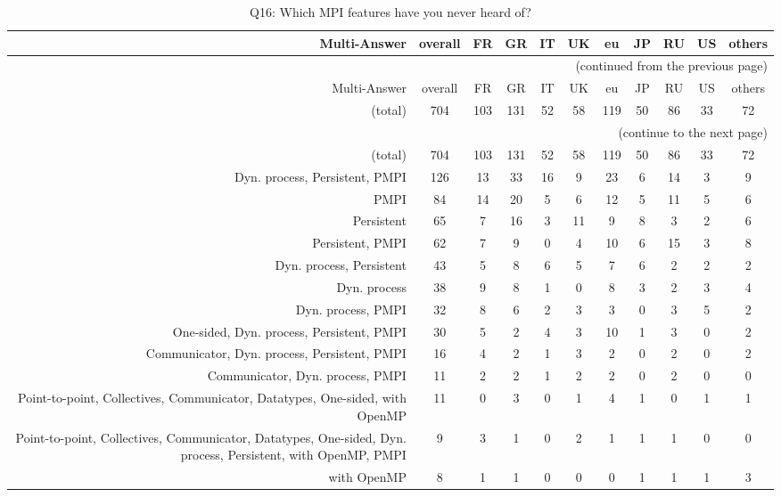 \clearpage%
{\footnotesize\begin{landscape}%
\begin{longtable}[htb]{r|c|c|c|c|c|c|c|c|c|c}%
\caption{Q16: Which MPI features have you never heard of?}%
\label{tab:Q16-mans} \\%
\hline%
Multi-Answer & overall & FR & GR & IT & UK & eu & JP & RU & US & others \\
 \hline%
\endfirsthead%
\multicolumn{11}{r}{(continued from the previous page)}\\%
\hline%
Multi-Answer & overall & FR & GR & IT & UK & eu & JP & RU & US & others \\
 \hline%
\endhead%
\hline%
(total) & 704 & 103 & 131 & 52 & 58 & 119 & 50 & 86 & 33 & 72 \\%
\hline%
\multicolumn{11}{r}{(continue to the next page)}\\%
\endfoot%
\hline%
(total) & 704 & 103 & 131 & 52 & 58 & 119 & 50 & 86 & 33 & 72 \\%
\hline%
\endlastfoot%
\hline%
{Dyn. process, Persistent, PMPI} & 126 & 13 & 33 & 16 & 9 & 23 & 6 & 14 & 3 & 9 \\%
{PMPI} & 84 & 14 & 20 & 5 & 6 & 12 & 5 & 11 & 5 & 6 \\%
{Persistent} & 65 & 7 & 16 & 3 & 11 & 9 & 8 & 3 & 2 & 6 \\%
{Persistent, PMPI} & 62 & 7 & 9 & 0 & 4 & 10 & 6 & 15 & 3 & 8 \\%
{Dyn. process, Persistent} & 43 & 5 & 8 & 6 & 5 & 7 & 6 & 2 & 2 & 2 \\%
{Dyn. process} & 38 & 9 & 8 & 1 & 0 & 8 & 3 & 2 & 3 & 4 \\%
{Dyn. process, PMPI} & 32 & 8 & 6 & 2 & 3 & 3 & 0 & 3 & 5 & 2 \\%
{One-sided, Dyn. process, Persistent, PMPI} & 30 & 5 & 2 & 4 & 3 & 10 & 1 & 3 & 0 & 2 \\%
{Communicator, Dyn. process, Persistent, PMPI} & 16 & 4 & 2 & 1 & 3 & 2 & 0 & 2 & 0 & 2 \\%
{Communicator, Dyn. process, PMPI} & 11 & 2 & 2 & 1 & 2 & 2 & 0 & 2 & 0 & 0 \\%
{Point-to-point, Collectives, Communicator, Datatypes, One-sided, with OpenMP} & 11 & 0 & 3 & 0 & 1 & 4 & 1 & 0 & 1 & 1 \\%
{Point-to-point, Collectives, Communicator, Datatypes, One-sided, Dyn. process, Persistent, with OpenMP, PMPI} & 9 & 3 & 1 & 0 & 2 & 1 & 1 & 1 & 0 & 0 \\%
{with OpenMP} & 8 & 1 & 1 & 0 & 0 & 0 & 1 & 1 & 1 & 3 \\%

\end{longtable}
\end{landscape}}
